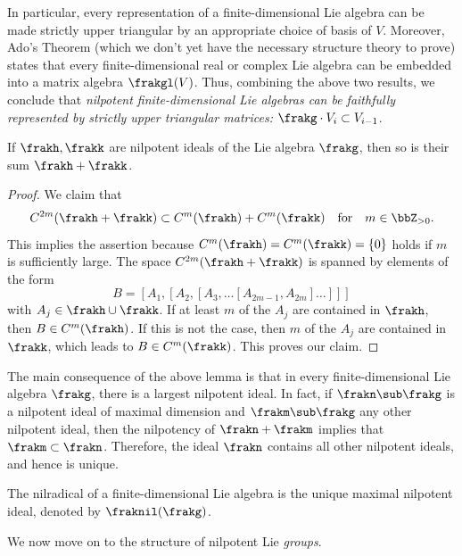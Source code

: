 In particular, every representation of a finite-dimensional Lie algebra can be made strictly upper triangular by an appropriate choice of basis of $V$. Moreover, Ado's Theorem (which we don't yet have the necessary structure theory to prove) states that every finite-dimensional real or complex Lie algebra can be embedded into a matrix algebra $\frakgl(V)$. Thus, combining the above two results, we conclude that \emph{nilpotent finite-dimensional Lie algebras can be faithfully represented by strictly upper triangular matrices:} $\frakg\cdot V_i\subset V_{i-1}$.

\begin{lem}[{\cite[Lem.~5.2.9]{HN}}]\label{lem 5.2.9 HN}
    If $\frakh,\frakk$ are nilpotent ideals of the Lie algebra $\frakg$, then so is their sum $\frakh+\frakk$.
\end{lem}
\begin{proof}
    We claim that 
    \[C^{2m}(\frakh+\frakk)\subset C^m(\frakh)+C^m(\frakk)\quad\text{for}\quad m\in\bbZ_{>0}.\]
    This implies the assertion because $C^m(\frakh)=C^m(\frakk)=\{0\}$ holds if $m$ is sufficiently large. The space $C^{2m}(\frakh+\frakk)$ is spanned by elements of the form 
    \[B=[A_1,[A_2,[A_3,\ldots[A_{2m-1},A_{2m}]\ldots]]]\]
    with $A_j\in\frakh\cup\frakk$. If at least $m$ of the $A_j$ are contained in $\frakh$, then $B\in C^m(\frakh)$. If this is not the case, then $m$ of the $A_j$ are contained in $\frakk$, which leads to $B\in C^m(\frakk)$. This proves our claim.
\end{proof}

The main consequence of the above lemma is that in every finite-dimensional Lie algebra $\frakg$, there is a largest nilpotent ideal. In fact, if $\frakn\sub\frakg$ is a nilpotent ideal of maximal dimension and $\frakm\sub\frakg$ any other nilpotent ideal, then the nilpotency of $\frakn+\frakm$ implies that $\frakm\subset\frakn$. Therefore, the ideal $\frakn$ contains all other nilpotent ideals, and hence is unique.

\begin{defn}[Nilradical]
    The nilradical of a finite-dimensional Lie algebra is the unique maximal nilpotent ideal, denoted by $\fraknil(\frakg)$.
\end{defn}

We now move on to the structure of nilpotent Lie \emph{groups}.


